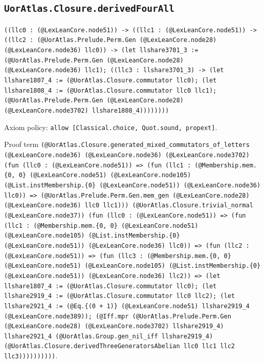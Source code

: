 \documentclass[11pt]{article}
\begin{document}
\subsection*{\texttt{UorAtlas.Closure.derivedFourAll}}
\noindent\texttt{((llc0 : (@LexLeanCore.node51)) -> ((llc1 : (@LexLeanCore.node51)) -> ((llc2 : (@UorAtlas.Prelude.Perm.Gen (@LexLeanCore.node28) (@LexLeanCore.node36) llc0)) -> (let llshare3701\_3 := (@UorAtlas.Prelude.Perm.Gen (@LexLeanCore.node28) (@LexLeanCore.node36) llc1); ((llc3 : llshare3701\_3) -> (let llshare1807\_4 := (@UorAtlas.Closure.commutator llc0); (let llshare1808\_4 := (@UorAtlas.Closure.commutator llc0 llc1); (@UorAtlas.Prelude.Perm.Gen (@LexLeanCore.node28) (@LexLeanCore.node3702) llshare1808\_4))))))))}\par
\noindent Axiom policy: \texttt{allow [Classical.choice, Quot.sound, propext]}.\par
\noindent Proof term \texttt{(@UorAtlas.Closure.generated\_mixed\_commutators\_of\_letters (@LexLeanCore.node36) (@LexLeanCore.node36) (@LexLeanCore.node3702) (fun (llc0 : (@LexLeanCore.node51)) => (fun (llc1 : (@Membership.mem.\{0, 0\} (@LexLeanCore.node51) (@LexLeanCore.node105) (@List.instMembership.\{0\} (@LexLeanCore.node51)) (@LexLeanCore.node36) llc0)) => (@UorAtlas.Prelude.Perm.Gen.mem\_gen (@LexLeanCore.node28) (@LexLeanCore.node36) llc0 llc1))) (@UorAtlas.Closure.trivial\_normal (@LexLeanCore.node37)) (fun (llc0 : (@LexLeanCore.node51)) => (fun (llc1 : (@Membership.mem.\{0, 0\} (@LexLeanCore.node51) (@LexLeanCore.node105) (@List.instMembership.\{0\} (@LexLeanCore.node51)) (@LexLeanCore.node36) llc0)) => (fun (llc2 : (@LexLeanCore.node51)) => (fun (llc3 : (@Membership.mem.\{0, 0\} (@LexLeanCore.node51) (@LexLeanCore.node105) (@List.instMembership.\{0\} (@LexLeanCore.node51)) (@LexLeanCore.node36) llc2)) => (let llshare1807\_4 := (@UorAtlas.Closure.commutator llc0); (let llshare2919\_4 := (@UorAtlas.Closure.commutator llc0 llc2); (let llshare2921\_4 := (@Eq.\{(0 + 1)\} (@LexLeanCore.node51) llshare2919\_4 (@LexLeanCore.node389)); (@Iff.mpr (@UorAtlas.Prelude.Perm.Gen (@LexLeanCore.node28) (@LexLeanCore.node3702) llshare2919\_4) llshare2921\_4 (@UorAtlas.Group.gen\_nil\_iff llshare2919\_4) (@UorAtlas.Closure.derivedThreeGeneratorsAbelian llc0 llc1 llc2 llc3))))))))))}.\par
\end{document}
